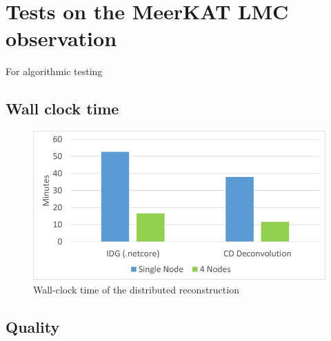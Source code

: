 \section{Tests on the MeerKAT LMC observation}\label{results}
For algorithmic testing


\subsection{Wall clock time}
\begin{figure}[h]
	\centering
	\includegraphics[width=0.80\linewidth]{./chapters/10.results/wall-clock-time.png}
	\caption{Wall-clock time of the distributed reconstruction}
	\label{results:time:fig}
\end{figure}

\subsection{Quality}
